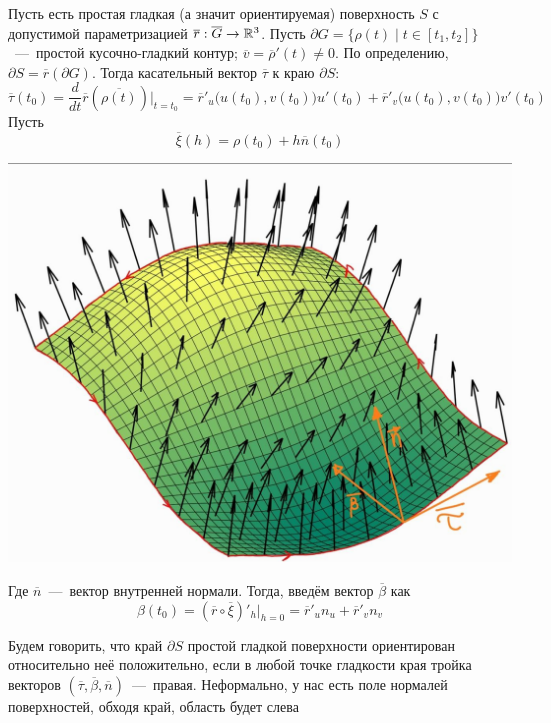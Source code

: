 \noindent 
\begin{minipage}{0.6\textwidth}
\begin{definition}
    Пусть есть простая гладкая (а значит ориентируемая) поверхность $S$ с допустимой параметризацией $\overline{r}: \overline{G} \rightarrow \mathbb{R}^3$. Пусть $\partial  G = \{\rho(t) \mid t \in [t_1, t_2]\}$~---~простой кусочно-гладкий контур; $\overline{v} = \overline{\rho}'(t) \neq 0$. По определению, $\partial  S = \overline{r}(\partial G)$. Тогда касательный вектор $\overline{\tau}$ к краю $\partial S$: \[\overline{\tau}(t_0) = \dfrac{d}{dt}\overline{r}(\overline{\rho(t)})|_{t = t_0} = \overline{r}'_u \Big(u(t_0), v(t_0)\Big)u'(t_0) + \overline{r}'_v \Big(u(t_0), v(t_0) \Big)v'(t_0)\]
    Пусть \[\overline{\xi}(h) = \rho(t_0) + h\overline{n}(t_0)\]
    
\end{definition}
\end{minipage}
\begin{minipage}{0.4\textwidth}
\includegraphics[width=\textwidth]{images/pov_orientation.png}
\end{minipage}
Где $\overline{n}$~---~вектор внутренней нормали. Тогда, введём вектор $\overline{\beta}$ как \[\beta(t_0) = (\overline{r} \circ \overline{\xi})'_h|_{h = 0} = \overline{r}'_un_u + \overline{r}'_vn_v\]
\begin{definition}
    Будем говорить, что край $\partial S$ простой гладкой поверхности ориентирован относительно неё положительно, если в любой точке гладкости края тройка векторов $(\overline{\tau}, \overline{\beta}, \overline{n})$~---~правая. Неформально, у нас есть поле нормалей поверхностей, обходя край, область будет слева

\end{definition}
    
